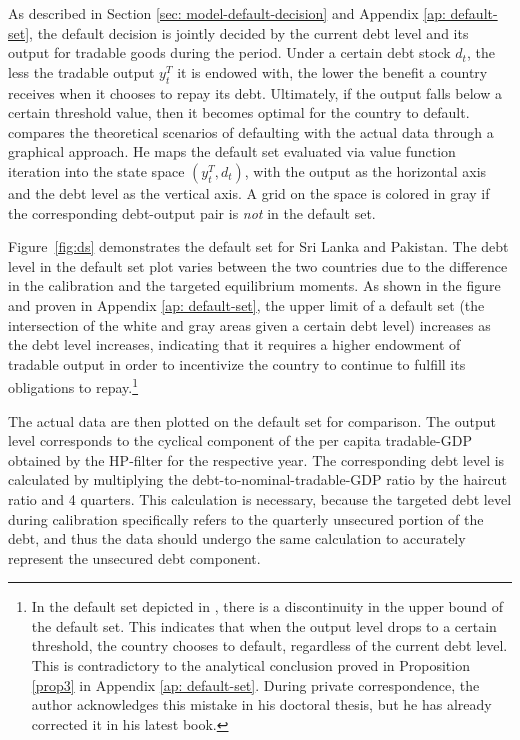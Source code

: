 As described in Section \ref{sec: model-default-decision} and Appendix \ref{ap: default-set}, the default decision is jointly decided by the current debt level and its output for tradable goods during the period. Under a certain debt stock $d_t$, the less the tradable output $y^T_t$ it is endowed with, the lower the benefit a country receives when it chooses to repay its debt.
Ultimately, if the output falls below a certain threshold value, then it becomes optimal for the country to default.
\citet{Hinrichsen_2020-chapter4} compares the theoretical scenarios of defaulting with the actual data through a graphical approach. He maps the default set evaluated via value function iteration into the state space $(y^T_t, d_t)$, with the output as the horizontal axis and the debt level as the vertical axis. A grid on the space is colored in gray if the corresponding debt-output pair is \emph{not} in the default set.

Figure~\ref{fig:ds} demonstrates the default set for Sri Lanka and Pakistan. The debt level in the default set plot varies between the two countries due to the difference in the calibration and the targeted equilibrium moments. As shown in the figure and proven in Appendix \ref{ap: default-set}, the upper limit of a default set (the intersection of the white and gray areas given a certain debt level) increases as the debt level increases, indicating that it requires a higher endowment of tradable output in order to incentivize the country to continue to fulfill its obligations to repay.\footnote{
    In the default set depicted in \citet{Hinrichsen_2020-chapter4}, there is a discontinuity in the upper bound of the default set. This indicates that when the output level drops to a certain threshold, the country chooses to default, regardless of the current debt level. This is contradictory to the analytical conclusion proved in Proposition \ref{prop3} in Appendix \ref{ap: default-set}. During private correspondence, the author acknowledges this mistake in his doctoral thesis, but he has already corrected it in his latest book.
}

The actual data are then plotted on the default set for comparison. The output level corresponds to the cyclical component of the per capita tradable-GDP obtained by the HP-filter for the respective year.
The corresponding debt level is calculated by multiplying the debt-to-nominal-tradable-GDP ratio by the haircut ratio and 4 quarters. This calculation is necessary, because the targeted debt level during calibration specifically refers to the quarterly unsecured portion of the debt, and thus the data should undergo the same calculation to accurately represent the unsecured debt component.

